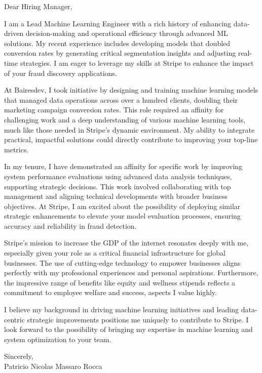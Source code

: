 \documentclass{article}
\begin{document}
\noindent Dear Hiring Manager,


I am a Lead Machine Learning Engineer with a rich history of enhancing data-driven decision-making and operational efficiency through advanced ML solutions. My recent experience includes developing models that doubled conversion rates by generating critical segmentation insights and adjusting real-time strategies. I am eager to leverage my skills at Stripe to enhance the impact of your fraud discovery applications.


At Bairesdev, I took initiative by designing and training machine learning models that managed data operations across over a hundred clients, doubling their marketing campaign conversion rates. This role required an affinity for challenging work and a deep understanding of various machine learning tools, much like those needed in Stripe’s dynamic environment. My ability to integrate practical, impactful solutions could directly contribute to improving your top-line metrics.


In my tenure, I have demonstrated an affinity for specific work by improving system performance evaluations using advanced data analysis techniques, supporting strategic decisions. This work involved collaborating with top management and aligning technical developments with broader business objectives. At Stripe, I am excited about the possibility of deploying similar strategic enhancements to elevate your model evaluation processes, ensuring accuracy and reliability in fraud detection.


Stripe’s mission to increase the GDP of the internet resonates deeply with me, especially given your role as a critical financial infrastructure for global businesses. The use of cutting-edge technology to empower businesses aligns perfectly with my professional experiences and personal aspirations. Furthermore, the impressive range of benefits like equity and wellness stipends reflects a commitment to employee welfare and success, aspects I value highly.


I believe my background in driving machine learning initiatives and leading data-centric strategic improvements positions me uniquely to contribute to Stripe. I look forward to the possibility of bringing my expertise in machine learning and system optimization to your team.

\vspace{1cm}
\setlength{\parskip}{0em}
\begin{flushright}
Sincerely,\\
Patricio Nicolas Massaro Rocca
\end{flushright}
\end{document}
